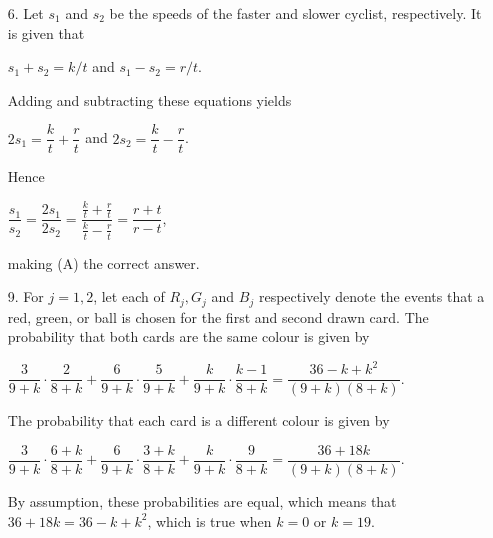 \documentclass[11pt,fleqn,dvipsnames,usenames]{article}
\begin{document}
\begin{enumerate}
\item[6.] Let $s_{1}$ and $s_{2}$ be the speeds of the faster and slower cyclist, respectively.  It is given that
\begin{center}
$s_{1} + s_{2} = k/t$ and $s_{1} - s_{2} = r/t$.
\end{center}
Adding and subtracting these equations yields
\begin{center}
$2s_{1} = \dfrac{k}{t} + \dfrac{r}{t}$ and $2s_{2} = \dfrac{k}{t} - \dfrac{r}{t}$.
\end{center}
Hence
\begin{center}
$\dfrac{s_{1}}{s_{2}} = \dfrac{2s_{1}}{2s_{2}} = \dfrac{\frac{k}{t} + \frac{r}{t}}{\frac{k}{t} - \frac{r}{t}} = \dfrac{r+t}{r-t}$,
\end{center}
making (A) the correct answer.

\item[9.] For $j=1,2$, let each of $R_{j}, G_{j}$ and $B_{j}$ respectively denote the events that a red, green, or ball is chosen for the first and second drawn card.  The probability that both cards are the same colour is given by
\begin{center}
$\dfrac{3}{9+k}\cdot\dfrac{2}{8 + k} + \dfrac{6}{9+k}\cdot\dfrac{5}{9+k} + \dfrac{k}{9+k}\cdot\dfrac{k-1}{8+k} = \dfrac{36 - k + k^2}{(9+k)(8+k)}$.
\end{center}
%
The probability that each card is a different colour is given by
\begin{center}
$\dfrac{3}{9+k}\cdot \dfrac{6+k}{8+k} + \dfrac{6}{9+k}\cdot \dfrac{3+k}{8+k} + \dfrac{k}{9+k}\cdot \dfrac{9}{8+k} = \dfrac{36 + 18k}{(9+k)(8+k)}$.
\end{center}
By assumption, these probabilities are equal, which means that $36 + 18k = 36 - k + k^2$, which is true when $k = 0$ or $k=19$.
\end{enumerate}
\end{document}
